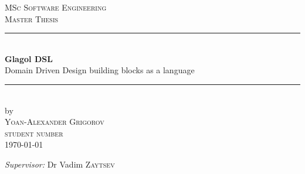 \documentclass{article}
\newcommand{\red}[1]{{\color{red}{#1}}}
\begin{document}
    \begin{titlepage}

        \newcommand{\HRule}{\rule{\linewidth}{0.5mm}}
        \center

        \textsc{\Large MSc Software Engineering}\\[0.2cm]
        \textsc{\Large Master Thesis}\\[0.5cm]

        \vspace*{\fill}


        \HRule \\[0.4cm]
        { \huge \bfseries Glagol DSL }\\[0.4cm]
        \large Domain Driven Design building blocks as a language
        \HRule \\[0.5cm]


        by\\[0.2cm]
        \textsc{\Large Yoan-Alexander Grigorov}\\[0.2cm] %
        \textsc{student number}\\[1cm]



        {\Large \today}\\[1cm] %

        \vspace*{\fill}

        \begin{center}
            \large
            \emph{Supervisor:} Dr Vadim \textsc{Zaytsev}
        \end{center}


\end{titlepage}
\end{document}
